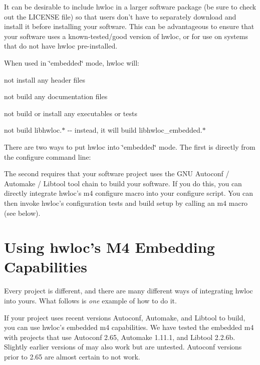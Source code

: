 It can be desirable to include hwloc in a larger software package (be sure to check out the LICENSE file) so that users don't have to separately download and install it before installing your software. This can be advantageous to ensure that your software uses a known-\/tested/good version of hwloc, or for use on systems that do not have hwloc pre-\/installed.

When used in \char`\"{}embedded\char`\"{} mode, hwloc will:


\begin{DoxyItemize}
\item not install any header files
\item not build any documentation files
\item not build or install any executables or tests
\item not build {\ttfamily libhwloc.$\ast$} -\/-\/ instead, it will build {\ttfamily libhwloc\_\-embedded.$\ast$}
\end{DoxyItemize}

There are two ways to put hwloc into \char`\"{}embedded\char`\"{} mode. The first is directly from the configure command line:



The second requires that your software project uses the GNU Autoconf / Automake / Libtool tool chain to build your software. If you do this, you can directly integrate hwloc's m4 configure macro into your configure script. You can then invoke hwloc's configuration tests and build setup by calling an m4 macro (see below).\hypertarget{a00010_embedding_m4}{}\section{Using hwloc's M4 Embedding Capabilities}\label{a00010_embedding_m4}
Every project is different, and there are many different ways of integrating hwloc into yours. What follows is {\itshape one\/} example of how to do it.

If your project uses recent versions Autoconf, Automake, and Libtool to build, you can use hwloc's embedded m4 capabilities. We have tested the embedded m4 with projects that use Autoconf 2.65, Automake 1.11.1, and Libtool 2.2.6b. Slightly earlier versions of may also work but are untested. Autoconf versions prior to 2.65 are almost certain to not work.


